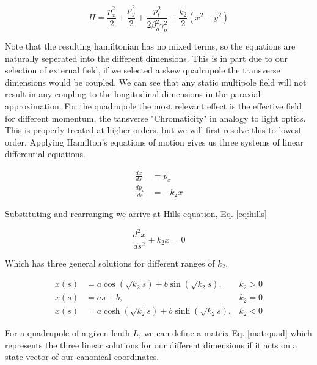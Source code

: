 \begin{equation} \label{eq:H_parax}
	H = \frac{p_x^2}{2} + \frac{p_y^2}{2} + \frac{p_t^2}{2\beta_o^2\gamma_o^2} + \frac{k_2}{2}(x^2 - y^2)
\end{equation}

Note that the resulting hamiltonian has no mixed terms, so the equations are naturally seperated into the different dimensions. This is in part due to our selection of external field, if we selected a skew quadrupole the transverse dimensions would be coupled. We can see that any static multipole field will not result in any coupling to the longitudinal dimensions in the paraxial approximation. For the quadrupole the most relevant effect is the effective field for different momentum, the tansverse "Chromaticity" in analogy to light optics. This is properly treated at higher orders, but we will first resolve this to lowest order. Applying Hamilton's equations of motion gives us three systems of linear differential equations.

\begin{equation} \label{eq:quad_diffeq}
\begin{split}
	\frac{dx}{ds} &= p_x\\ 
	\frac{dp_x}{ds} &= -k_2 x
\end{split}
\end{equation}

Substituting and rearranging we arrive at Hills equation, Eq. \ref{eq:hills}

\begin{equation} \label{eq:hills}
	\frac{d^2 x}{ds^2} + k_2 x = 0
\end{equation}

Which has three general solutions for different ranges of $k_2$.

\begin{align} \label{eq:hillSol}
	x(s) &= a \cos{\left(\sqrt{k_2} s\right)} + b \sin{\left(\sqrt{k_2} s\right)}, &k_2>0\\
	x(s) &= a s + b, &k_2 =0 \\
	x(s) &= a \cosh{\left(\sqrt{k_2} s\right)} + b \sinh{\left(\sqrt{k_2} s\right)}, &k_2<0
\end{align}

For a quadrupole of a given lenth $L$, we can define a matrix Eq. \ref{mat:quad} which represents the three linear solutions for our different dimensions if it acts on a state vector of our canonical coordinates.

